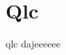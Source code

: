 \documentclass[main.tex]{subfiles}
\begin{document}
\sloppy


\vspace{1.0cm}

\section{Qlc}\label{sec:Qlc}
qlc dajeeeeee 
\end{document}
